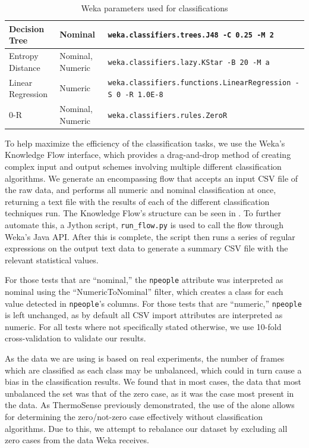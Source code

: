 \documentclass[../thesis/thesis.tex]{subfiles}
\begin{document}
\begin{table}[h]
\begin{tabular}{|p{40mm}|p{20mm}|p{70mm}|}
Decision Tree & Nominal & \texttt{weka.classifiers.trees.J48 \newline -C 0.25 -M 2} \\ \hline

Entropy Distance & Nominal, \newline Numeric & \texttt{weka.classifiers.lazy.KStar \newline -B 20 -M a} \\ \hline %

Linear Regression & Numeric & \texttt{weka.classifiers.functions\newline.LinearRegression \newline -S 0 -R 1.0E-8} \\ \hline

0-R & Nominal, \newline Numeric & \texttt{weka.classifiers.rules.ZeroR} \\ \hline
\end{tabular}
\caption{Weka parameters used for classifications}
\label{tab:methods:params}
\end{table}

To help maximize the efficiency of the classification tasks, we use the Weka's Knowledge Flow interface, which provides a drag-and-drop method of creating complex input and output schemes involving multiple different classification algorithms. We generate an encompassing flow that accepts an input CSV file of the raw data, and performs all numeric and nominal classification at once, returning a text file with the results of each of the different classification techniques run. The Knowledge Flow's structure can be seen in . To further automate this, a Jython script, \texttt{run\_flow.py} is used to call the flow through Weka's Java API. After this is complete, the script then runs a series of regular expressions on the output text data to generate a summary CSV file with the relevant statistical values.

For those tests that are ``nominal,'' the \texttt{npeople} attribute was interpreted as nominal using the ``NumericToNominal'' filter, which creates a class for each value detected in \texttt{npeople}'s columns. For those tests that are ``numeric,'' \texttt{npeople} is left unchanged, as by default all CSV import attributes are interpreted as numeric. For all tests where not specifically stated otherwise, we use 10-fold cross-validation to validate our results.

As the data we are using is based on real experiments, the number of frames which are classified as each class may be unbalanced, which could in turn cause a bias in the classification results. We found that in most cases, the data that most unbalanced the set was that of the zero case, as it was the case most present in the data. As ThermoSense previously demonstrated, the use of the \pir alone allows for determining the zero/not-zero case effectively without classification algorithms. Due to this, we attempt to rebalance our dataset by excluding all zero cases from the data Weka receives.
\end{document}
